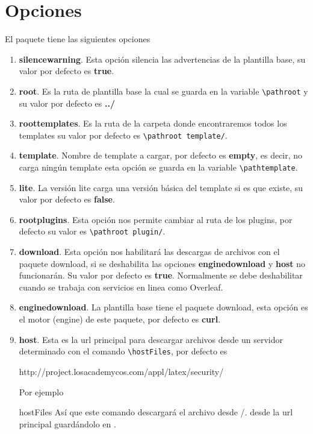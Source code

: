 {	\section{Opciones}\label{sec:opciones}
	El paquete \printproject\space tiene las siguientes opciones
	\begin{enumerate}
		\item \textbf{silencewarning}. Esta opción silencia las advertencias de la plantilla base, su valor por defecto es \textbf{true}.
		\item \textbf{root}. Es la ruta de plantilla base la cual se guarda en la variable \verb|\pathroot| y su valor por defecto es \textbf{../}
		\item \textbf{roottemplates}. Es la ruta de la carpeta donde encontraremos todos los templates su valor por defecto es \verb|\pathroot template/|.
		\item \textbf{template}. Nombre de template a cargar, por defecto es \textbf{empty}, es decir, no carga ningún template  esta opción se guarda en la variable \verb|\pathtemplate|.
		\item \textbf{lite}. La versión lite carga una versión básica del template si es que existe, su valor por defecto es \textbf{false}.
		\item \textbf{rootplugins}. Esta opción nos permite cambiar al ruta de los plugins, por defecto su valor es \verb|\pathroot plugin/|.
		\item \textbf{download}. Esta opción nos habilitará las descargas de archivos con el paquete download, si se deshabilita las opciones \textbf{enginedownload} y \textbf{host} no funcionarán. Su valor por defecto es \textbf{true}. Normalmente se debe deshabilitar cuando se trabaja con servicios en linea como Overleaf.
		\item \textbf{enginedownload}. La plantilla base tiene el paquete download, esta opción es el motor (engine) de este paquete, por defecto es \textbf{curl}.
		\item \textbf{host}. Esta es la url principal para descargar archivos desde un servidor determinado con el comando \verb|\hostFiles|, por defecto es
		\begin{center}
			http://project.losacademycos.com/appl/latex/security/
		\end{center}
		Por ejemplo 
		\begin{docCommand}{hostFiles}{}
			Así que este comando descargará el archivo desde /. desde la url principal guardándolo en .

\end{docCommand}
\end{enumerate}}
